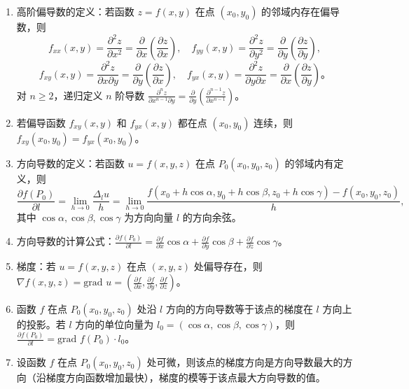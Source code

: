 \documentclass[UTF8]{ctexart}
\theoremstyle{remark}
\begin{document}
\begin{enumerate}
	\item 高阶偏导数的定义：若函数 \(z = f(x, y)\) 在点 \((x_0, y_0)\) 的邻域内存在偏导数，则
	\[
	f_{xx}(x, y) = \frac{\partial^2 z}{\partial x^2} = \frac{\partial}{\partial x}\left(\frac{\partial z}{\partial x}\right), \quad f_{yy}(x, y) = \frac{\partial^2 z}{\partial y^2} = \frac{\partial}{\partial y}\left(\frac{\partial z}{\partial y}\right),
	\]
	\[
	f_{xy}(x, y) = \frac{\partial^2 z}{\partial x \partial y} = \frac{\partial}{\partial y}\left(\frac{\partial z}{\partial x}\right), \quad f_{yx}(x, y) = \frac{\partial^2 z}{\partial y \partial x} = \frac{\partial}{\partial x}\left(\frac{\partial z}{\partial y}\right)。
	\]
	对 \(n \geq 2\)，递归定义 \(n\) 阶导数 \(\frac{\partial^n z}{\partial x^{n-1} \partial y} = \frac{\partial}{\partial y}\left(\frac{\partial^{n-1} z}{\partial x^{n-1}}\right)\)。
	
	\item 若偏导函数 \(f_{xy}(x, y)\) 和 \(f_{yx}(x, y)\) 都在点 \((x_0, y_0)\) 连续，则 \(f_{xy}(x_0, y_0) = f_{yx}(x_0, y_0)\)。
	
	\item 方向导数的定义：若函数 \(u = f(x, y, z)\) 在点 \(P_0(x_0, y_0, z_0)\) 的邻域内有定义，则
	\[
	\frac{\partial f(P_0)}{\partial l} = \lim_{h \to 0} \frac{\Delta_l u}{h} = \lim_{h \to 0} \frac{f(x_0 + h\cos\alpha, y_0 + h\cos\beta, z_0 + h\cos\gamma) - f(x_0, y_0, z_0)}{h},
	\]
	其中 \(\cos\alpha, \cos\beta, \cos\gamma\) 为方向向量 \(l\) 的方向余弦。
	
	\item 方向导数的计算公式：\(\frac{\partial f(P_0)}{\partial l} = \frac{\partial f}{\partial x}\cos\alpha + \frac{\partial f}{\partial y}\cos\beta + \frac{\partial f}{\partial z}\cos\gamma\)。
	
	\item 梯度：若 \(u = f(x, y, z)\) 在点 \((x, y, z)\) 处偏导存在，则 \(\nabla f(x, y, z) = \text{grad }u = \left(\frac{\partial f}{\partial x}, \frac{\partial f}{\partial y}, \frac{\partial f}{\partial z}\right)\)。
	
	\item 函数 \(f\) 在点 \(P_0(x_0, y_0, z_0)\) 处沿 \(l\) 方向的方向导数等于该点的梯度在 \(l\) 方向上的投影。若 \(l\) 方向的单位向量为 \(l_0 = (\cos\alpha, \cos\beta, \cos\gamma)\)，则 \(\frac{\partial f(P_0)}{\partial l} = \text{grad }f(P_0) \cdot l_0\)。
	
	\item 设函数 \(f\) 在点 \(P_0(x_0, y_0, z_0)\) 处可微，则该点的梯度方向是方向导数最大的方向（沿梯度方向函数增加最快），梯度的模等于该点最大方向导数的值。
	

\end{enumerate}
\end{document}
